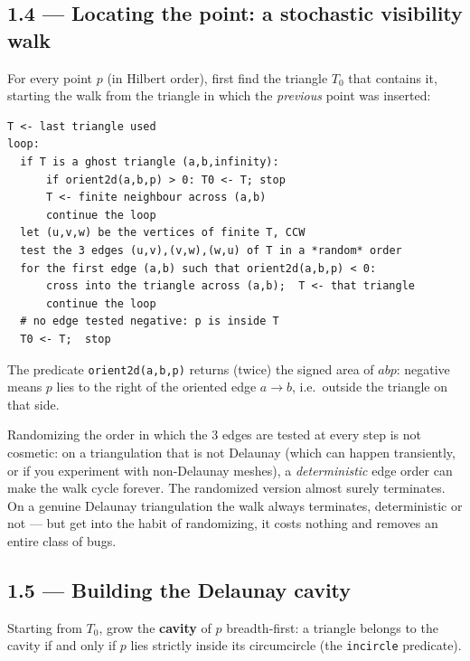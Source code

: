 \documentclass[11pt,a4paper]{article}
\begin{document}
\subsection*{1.4 --- Locating the point: a stochastic visibility walk}

For every point $p$ (in Hilbert order), first find the triangle $T_0$ that
contains it, starting the walk from the triangle in which the
\emph{previous} point was inserted:

\begin{lstlisting}[style=code,caption={Stochastic visibility walk},captionpos=b]
T <- last triangle used
loop:
  if T is a ghost triangle (a,b,infinity):
      if orient2d(a,b,p) > 0: T0 <- T; stop
      T <- finite neighbour across (a,b)
      continue the loop
  let (u,v,w) be the vertices of finite T, CCW
  test the 3 edges (u,v),(v,w),(w,u) of T in a *random* order
  for the first edge (a,b) such that orient2d(a,b,p) < 0:
      cross into the triangle across (a,b);  T <- that triangle
      continue the loop
  # no edge tested negative: p is inside T
  T0 <- T;  stop
\end{lstlisting}

The predicate \lstinline{orient2d(a,b,p)} returns (twice) the signed area of
$abp$: negative means $p$ lies to the right of the oriented edge
$a\!\to\!b$, i.e.\ outside the triangle on that side.

\begin{note}
Randomizing the order in which the 3 edges are tested at every step is not
cosmetic: on a triangulation that is not Delaunay (which can happen
transiently, or if you experiment with non-Delaunay meshes), a
\emph{deterministic} edge order can make the walk cycle forever. The
randomized version almost surely terminates. On a genuine Delaunay
triangulation the walk always terminates, deterministic or not --- but get
into the habit of randomizing, it costs nothing and removes an entire class
of bugs.
\end{note}

\subsection*{1.5 --- Building the Delaunay cavity}

Starting from $T_0$, grow the \textbf{cavity} of $p$ breadth-first: a
triangle belongs to the cavity if and only if $p$ lies strictly inside its
circumcircle (the \lstinline{incircle} predicate).
\end{document}
